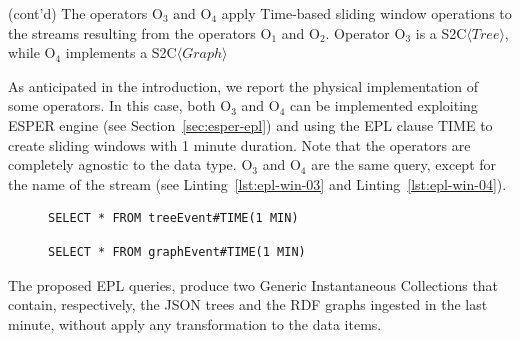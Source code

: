 \begin{Example}
(cont'd) The operators O$_3$ and O$_4$ apply Time-based sliding window operations to the streams resulting from the operators O$_1$ and O$_2$.
Operator O$_3$ is a S2C$\langle Tree \rangle$, while O$_4$ implements a S2C$\langle Graph \rangle$

As anticipated in the introduction, we report the physical implementation of some operators. 
In this case, both O$_3$ and O$_4$ can be implemented exploiting ESPER engine (see Section~\ref{sec:esper-epl}) and using the EPL clause TIME to create sliding windows with 1 minute duration.
Note that the operators are completely agnostic to the data type. O$_3$ and O$_4$ are the same query, except for the name of the stream (see Linting~\ref{lst:epl-win-03} and Linting~\ref{lst:epl-win-04}).

\begin{figure}[ht]
\begin{minipage}{0.95\linewidth}
\begin{lstlisting}[caption={EPL query, applied by O$_3$ operator, to window the stream of JSON trees},label=lst:epl-win-03,style=ESPER]
     SELECT * FROM treeEvent#TIME(1 MIN) 
\end{lstlisting}
\end{minipage}
\end{figure}

\begin{figure}[ht]
\begin{minipage}{0.95\linewidth}
\begin{lstlisting}[caption={EPL query, applied by O$_4$ operator, to window the stream of RDF graphs},label=lst:epl-win-04,style=ESPER]
     SELECT * FROM graphEvent#TIME(1 MIN) 
\end{lstlisting}
\end{minipage}
\end{figure}

The proposed EPL queries, produce two Generic Instantaneous Collections that contain, respectively, the JSON trees and the RDF graphs ingested in the last minute, without apply any transformation to the data items.


\end{Example}
